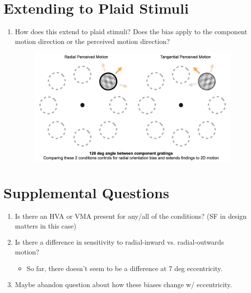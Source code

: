 \documentclass[11pt]{article} %
\begin{document}
\section{Extending to Plaid Stimuli} 
\begin{enumerate}
	\item How does this extend to plaid stimuli? Does the bias apply to the component motion direction or the perceived motion direction?
	\begin{figure}[H]
	\centering %
	\includegraphics[scale=.25]{Images/Cartoon5.png}
	\end{figure}
\end{enumerate}
\section{Supplemental Questions} 
\begin{enumerate}
	\item Is there an HVA or VMA present for any/all of the conditions? (SF in design matters in this case)
	\item Is there a difference in sensitivity to radial-inward vs. radial-outwards motion? 
	\begin{itemize}
	\item{So far, there doesn't seem to be a difference at 7 deg eccentricity.}
	\end{itemize}
	\item Maybe abandon question about how these biases change w/ eccentricity.
\end{enumerate}

\newpage
\end{document}
